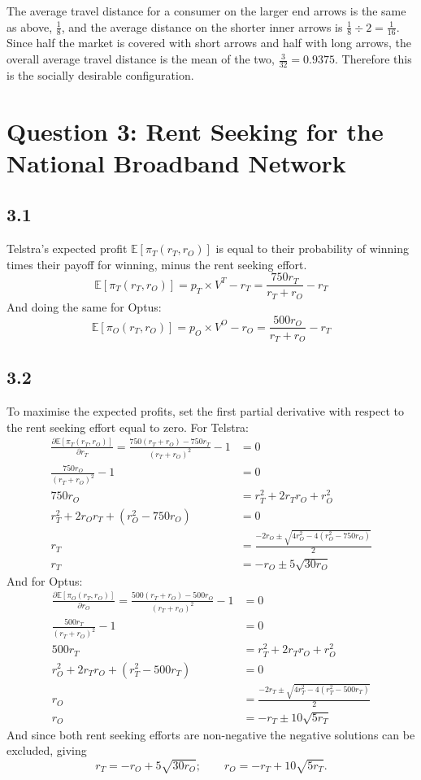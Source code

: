 \documentclass{article}
\newcommand{\tE}[1]{$\mathbb{E}[\mbox{#1}]$}
\newcommand{\E}[1]{\mathbb{E}[\mbox{#1}]}
\begin{document}
\noindent The average travel distance for a consumer on the larger end arrows is the same as above, $\frac{1}{8}$, and the average distance on the shorter inner arrows is $\frac{1}{8} \div 2 = \frac{1}{16}$. Since half the market is covered with short arrows and half with long arrows, the overall average travel distance is the mean of the two, $\frac{3}{32} = 0.9375$. Therefore this is the socially desirable configuration.

\section*{Question 3: Rent Seeking for the National Broadband Network}
\subsection*{3.1}
Telstra's expected profit \tE{$\pi_{T}(r_{T}, r_{O})$} is equal to their probability of winning times their payoff for winning, minus the rent seeking effort.
$$\E{$\pi_{T}(r_{T}, r_{O})$} = p_{T} \times V^{T} - r_{T} = \frac{750r_{T}}{r_{T} + r_{O}} - r_{T}$$
And doing the same for Optus:
$$\E{$\pi_{O}(r_{T}, r_{O})$} = p_{O} \times V^{O} - r_{O} = \frac{500r_{O}}{r_{T} + r_{O}} - r_{T}$$

\subsection*{3.2}
To maximise the expected profits, set the first partial derivative with respect to the rent seeking effort equal to zero. For Telstra:
\begin{align*}
    \frac{\partial \E{$\pi_{T}(r_{T}, r_{O})$}}{\partial r_{T}} = \frac{750(r_{T} + r_{O}) - 750r_{T}}{(r_{T} + r_{O})^{2}} - 1 &= 0\\
    \frac{750r_{O}}{(r_{T} + r_{O})^{2}} - 1 &= 0\\
    750r_{O} &= r_{T}^{2} + 2r_{T}r_{O} + r_{O}^{2}\\
    r_{T}^{2} + 2r_{O}r_{T} + (r_{O}^{2} - 750r_{O}) &= 0\\
    r_{T} &= \frac{-2r_{O} \pm \sqrt{4r_{O}^{2} - 4(r_{O}^{2} - 750r_{O})}}{2}\\
    r_{T} &= -r_{O} \pm 5\sqrt{30r_{O}}
\end{align*}
And for Optus:
\begin{align*}
    \frac{\partial \E{$\pi_{O}(r_{T}, r_{O})$}}{\partial r_{O}} = \frac{500(r_{T} + r_{O}) - 500r_{O}}{(r_{T} + r_{O})^{2}} - 1 &= 0\\
    \frac{500r_{T}}{(r_{T} + r_{O})^{2}} - 1 &= 0\\
    500r_{T} &= r_{T}^{2} + 2r_{T}r_{O} + r_{O}^{2}\\
    r_{O}^{2} + 2r_{T}r_{O} + (r_{T}^{2} - 500r_{T}) &= 0\\
    r_{O} &= \frac{-2r_{T} \pm \sqrt{4r_{T}^{2} - 4(r_{T}^{2} - 500r_{T})}}{2}\\
    r_{O} &= -r_{T} \pm 10\sqrt{5r_{T}}
\end{align*}
And since both rent seeking efforts are non-negative the negative solutions can be excluded, giving
$$r_{T} = -r_{O} + 5\sqrt{30r_{O}}; \qquad r_{O} = -r_{T} + 10\sqrt{5r_{T}}.$$
\end{document}
